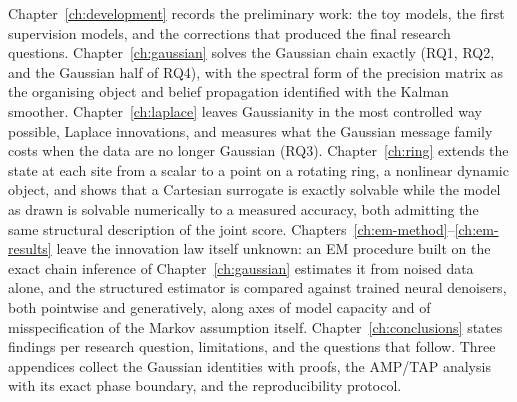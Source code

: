 Chapter~\ref{ch:development} records the preliminary work: the toy
models, the first supervision models, and the corrections that produced
the final research questions. Chapter~\ref{ch:gaussian} solves the
Gaussian chain exactly (RQ1, RQ2, and the Gaussian half of RQ4), with
the spectral form of the precision matrix as the organising object and
belief propagation identified with the Kalman smoother.
Chapter~\ref{ch:laplace} leaves Gaussianity in the most controlled way
possible, Laplace innovations, and measures what the Gaussian message
family costs when the data are no longer Gaussian (RQ3).
Chapter~\ref{ch:ring} extends the state at each site from a scalar to a
point on a rotating ring, a nonlinear dynamic object, and shows that a
Cartesian surrogate is exactly solvable while the model as drawn is
solvable numerically to a measured accuracy, both admitting the same
structural description of the joint score.
Chapters~\ref{ch:em-method}--\ref{ch:em-results} leave the innovation law
itself unknown: an EM procedure built on the exact chain inference of
Chapter~\ref{ch:gaussian} estimates it from noised data alone, and the
structured estimator is compared against trained neural denoisers, both
pointwise and generatively, along axes of model capacity and of
misspecification of the Markov assumption itself.
Chapter~\ref{ch:conclusions} states findings per research question,
limitations, and the questions that follow. Three appendices collect the
Gaussian identities with proofs, the AMP/TAP analysis with its exact
phase boundary, and the reproducibility protocol.
